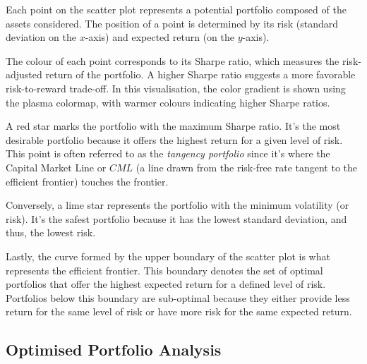 \documentclass[a4paper,12pt,titlepage]{article}
\numberwithin{equation}{section}
\begin{document}
Each point on the scatter plot represents a potential portfolio composed of 
the assets considered. The position of a point is determined by its risk (standard deviation 
on the $x$-axis) and expected return (on the $y$-axis).\newline \par \noindent The colour 
of each point corresponds to its Sharpe ratio, which measures the risk-adjusted return of the 
portfolio. A higher Sharpe ratio suggests a more favorable risk-to-reward trade-off. In this visualisation, 
the color gradient is shown using the plasma colormap, with warmer colours indicating higher 
Sharpe ratios. \newline \par \noindent A red star marks the portfolio with the maximum Sharpe 
ratio. It's the most desirable portfolio because it offers the highest return for a given level of 
risk. This point is often referred to as the \textit{tangency portfolio} since it's where the Capital 
Market Line or $CML$ (a line drawn from the risk-free rate tangent to the efficient frontier) touches the 
frontier.\newline \par \noindent Conversely, a lime star represents the portfolio with the minimum 
volatility (or risk). It's the safest portfolio because it has the lowest standard deviation, 
and thus, the lowest risk. \newline \par \noindent Lastly, the curve formed by the 
upper boundary of the scatter plot is what represents the efficient frontier. This boundary denotes the 
set of optimal portfolios that offer the highest expected return for a defined level of risk. 
Portfolios below this boundary are sub-optimal because they either provide less return for the same 
level of risk or have more risk for the same expected return.

\subsection{Optimised Portfolio Analysis}
\end{document}
